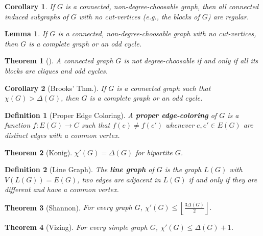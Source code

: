 \documentclass{article}
\newcommand{\floor}[1]{\left\lfloor#1\right\rfloor}
\newcommand{\st}{such that }
\newtheorem*{definition}{Definition}
\newtheorem*{lemma}{Lemma}
\newtheorem*{theorem}{Theorem}
\newtheorem*{corollary}{Corollary}
\begin{document}
\begin{corollary}
    If $ G $ is a connected, non-degree-choosable graph, then all connected induced subgraphs of $ G $ with no cut-vertices (e.g., the blocks of $ G $)
    are regular.
\end{corollary}

\begin{lemma}
    If $ G $ is a connected, non-degree-choosable graph with no cut-vertices, then $ G $ is a complete graph or an odd cycle.
\end{lemma}

\begin{theorem}[]
    A connected graph $ G $ is not degree-choosable if and only if all its blocks are cliques and odd cycles.
\end{theorem}

\begin{corollary}[Brooks' Thm.]
    If $ G $ is a connected graph \st $ \chi(G) > \Delta(G) $, then $ G $ is a complete graph or an odd cycle.
\end{corollary}

\begin{definition}[Proper Edge Coloring]
    A \textbf{proper edge-coloring} of $ G $ is a function $ f: E(G) \to C $ \st $ f(e) \neq f(e') $ whenever $ e,e' \in E(G) $ are
    distinct edges with a common vertex.
\end{definition}

\begin{theorem}[Konig]
    $ \chi'(G) = \Delta(G) $ for bipartite $ G $.
\end{theorem}

\begin{definition}[Line Graph]
    The \textbf{line graph} of $ G $ is the graph $ L(G) $ with $ V(L(G)) = E(G) $, two edges are adjacent in $ L(G) $ if and only if
    they are different and have a common vertex.
\end{definition}

\begin{theorem}[Shannon]
    For every graph $ G $, $ \chi'(G) \leq \floor{\frac{3\Delta(G)}{2}} $.
\end{theorem}

\begin{theorem}[Vizing]
    For every simple graph $ G $, $ \chi'(G) \leq \Delta(G) + 1 $.
\end{theorem}
\end{document}
